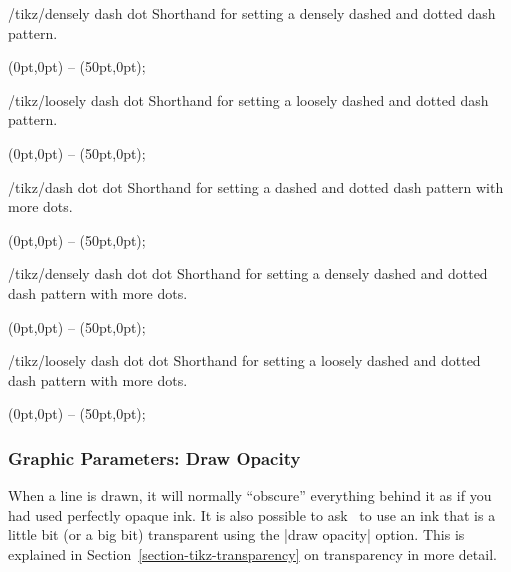 \begin{stylekey}{/tikz/densely dash dot}
    Shorthand for setting a densely dashed and dotted dash pattern.
\begin{codeexample}[]
\tikz {} (0pt,0pt) -- (50pt,0pt);
\end{codeexample}
\end{stylekey}

\begin{stylekey}{/tikz/loosely dash dot}
    Shorthand for setting a loosely dashed and dotted dash pattern.
\begin{codeexample}[]
\tikz {} (0pt,0pt) -- (50pt,0pt);
\end{codeexample}
\end{stylekey}

\begin{stylekey}{/tikz/dash dot dot}
    Shorthand for setting a dashed and dotted dash pattern with more dots.
\begin{codeexample}[]
\tikz {} (0pt,0pt) -- (50pt,0pt);
\end{codeexample}
\end{stylekey}

\begin{stylekey}{/tikz/densely dash dot dot}
    Shorthand for setting a densely dashed and dotted dash pattern with more dots.
\begin{codeexample}[]
\tikz {} (0pt,0pt) -- (50pt,0pt);
\end{codeexample}
\end{stylekey}

\begin{stylekey}{/tikz/loosely dash dot dot}
    Shorthand for setting a loosely dashed and dotted dash pattern with more dots.
\begin{codeexample}[]
\tikz {} (0pt,0pt) -- (50pt,0pt);
\end{codeexample}
\end{stylekey}


\subsubsection{Graphic Parameters: Draw Opacity}

When a line is drawn, it will normally ``obscure'' everything behind it as if
you had used perfectly opaque ink. It is also possible to ask \tikzname\ to use
an ink that is a little bit (or a big bit) transparent using the |draw opacity|
option. This is explained in Section~\ref{section-tikz-transparency} on
transparency in more detail.


